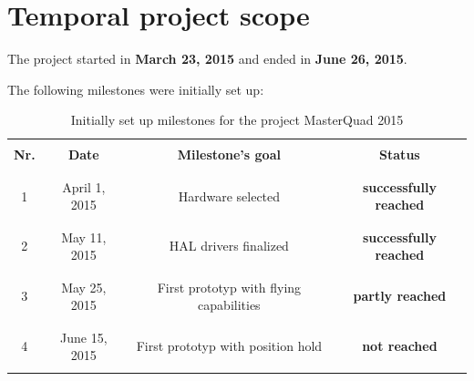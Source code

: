 \section{Temporal project scope}
\label{sec:projGoals:temporalProj}
The project started in \textbf{March 23, 2015} and ended in \textbf{June 26, 2015}.

The following milestones were initially set up:
\begin{table}[H]	
	\begin{tabular}{|c|c|c|c|}
\hline
&&&\\
\textbf{Nr.} & \textbf{Date} & \textbf{Milestone's goal} & \textbf{Status}\\
&&&\\
\hhline{|=|=|=|=|}
&&&\\
	1 & April 1, 2015 & Hardware selected & \textcolor[rgb]{0,0.58,0}{\textbf{successfully reached}}\\
	&&&\\
\hline
&&&\\
				2 & May 11, 2015 & HAL drivers finalized& \textcolor[rgb]{0,0.58,0}{\textbf{successfully reached}}\\
				&&&\\
\hline
&&&\\
				3 & May 25, 2015&First prototyp with flying capabilities& \textcolor[rgb]{1,0.41,0.13}{\textbf{partly reached}}\\
				&&&\\
\hline
&&&\\
				4 & June 15, 2015& First prototyp with position hold &\textcolor[rgb]{1,0,0}{\textbf{not reached}}\\
				&&&\\
\hline
	\end{tabular}
	\caption{Initially set up milestones for the project MasterQuad 2015}
	\label{tab:projGoals:milestones}
\end{table}
